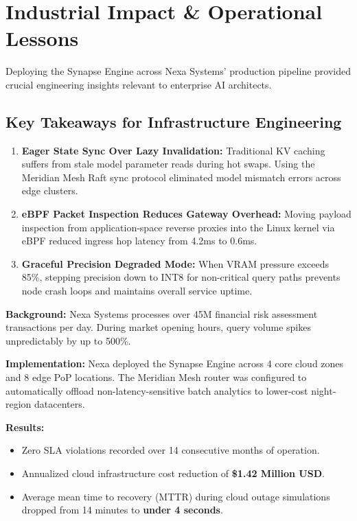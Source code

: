 \documentclass[10pt, a4paper]{article}
\begin{document}
\vspace{10pt}

\section{Industrial Impact \& Operational Lessons}

Deploying the Synapse Engine across Nexa Systems' production pipeline provided crucial engineering insights relevant to enterprise AI architects.

\subsection{Key Takeaways for Infrastructure Engineering}
\begin{enumerate}[label=\bfseries T\arabic*., leftmargin=2em]
  \item \textbf{Eager State Sync Over Lazy Invalidation:} Traditional KV caching suffers from stale model parameter reads during hot swaps. Using the Meridian Mesh Raft sync protocol eliminated model mismatch errors across edge clusters.
  \item \textbf{eBPF Packet Inspection Reduces Gateway Overhead:} Moving payload inspection from application-space reverse proxies into the Linux kernel via eBPF reduced ingress hop latency from 4.2ms to 0.6ms.
  \item \textbf{Graceful Precision Degraded Mode:} When VRAM pressure exceeds 85\%, stepping precision down to INT8 for non-critical query paths prevents node crash loops and maintains overall service uptime.
\end{enumerate}

\vspace{8pt}

\begin{tcolorbox}[summitbox, title=\faBuilding\ Case Study: Nexa Enterprise Financial Analytics Deployments]
  \sffamily\small
  \textbf{Background:} Nexa Systems processes over 45M financial risk assessment transactions per day. During market opening hours, query volume spikes unpredictably by up to 500\%.

  \textbf{Implementation:} Nexa deployed the Synapse Engine across 4 core cloud zones and 8 edge PoP locations. The Meridian Mesh router was configured to automatically offload non-latency-sensitive batch analytics to lower-cost night-region datacenters.

  \textbf{Results:}
  \begin{itemize}[leftmargin=1.2em, topsep=2pt, itemsep=2pt]
    \item Zero SLA violations recorded over 14 consecutive months of operation.
    \item Annualized cloud infrastructure cost reduction of \textbf{\$1.42 Million USD}.
    \item Average mean time to recovery (MTTR) during cloud outage simulations dropped from 14 minutes to \textbf{under 4 seconds}.
  \end{itemize}
\end{tcolorbox}
\end{document}
